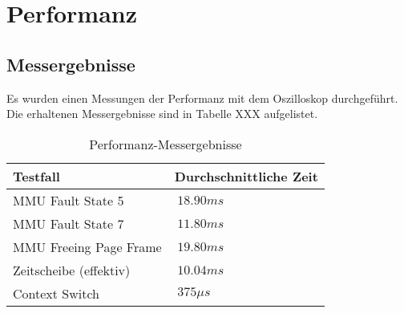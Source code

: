 \section{Performanz}
\label{Performanz}

\subsection{Messergebnisse}
Es wurden einen Messungen der Performanz mit dem Oszilloskop durchgeführt. Die erhaltenen Messergebnisse sind in Tabelle XXX aufgelistet.

\begin{table}[H]
\begin{tabular}{p{7cm} | p{7cm}}
  \textbf{Testfall} & \textbf{Durchschnittliche Zeit} \\ \hline
  	MMU Fault State 5 & $~18.90 ms$ \\
  	MMU Fault State 7 & $~11.80 ms$ \\
  	MMU Freeing Page Frame & $~19.80 ms$ \\
  	Zeitscheibe (effektiv) & $~10.04 ms$ \\
  	Context Switch & $~375 \mu s$ \\
 \end{tabular}
 \caption{Performanz-Messergebnisse}
 \label{table:SpecifiedVirtualMemory}
\end{table}

\pagebreak 